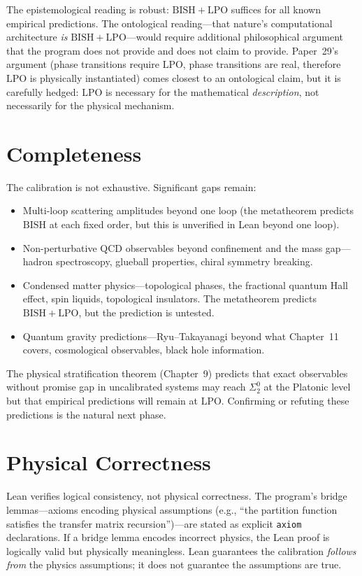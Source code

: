 \documentclass[11pt,a4paper]{report}
\theoremstyle{plain}
\theoremstyle{definition}
\theoremstyle{remark}
\newcommand{\BISH}{\mathrm{BISH}}
\newcommand{\LPO}{\mathrm{LPO}}
\begin{document}
The epistemological reading is robust: $\BISH+\LPO$ suffices for all known empirical predictions. The ontological reading---that nature's computational architecture \emph{is} $\BISH+\LPO$---would require additional philosophical argument that the program does not provide and does not claim to provide. Paper~29's argument (phase transitions require $\LPO$, phase transitions are real, therefore $\LPO$ is physically instantiated) comes closest to an ontological claim, but it is carefully hedged: $\LPO$ is necessary for the mathematical \emph{description}, not necessarily for the physical mechanism.

\section{Completeness}

The calibration is not exhaustive. Significant gaps remain:
\begin{itemize}[nosep]
\item Multi-loop scattering amplitudes beyond one loop (the metatheorem predicts $\BISH$ at each fixed order, but this is unverified in Lean beyond one loop).
\item Non-perturbative QCD observables beyond confinement and the mass gap---hadron spectroscopy, glueball properties, chiral symmetry breaking.
\item Condensed matter physics---topological phases, the fractional quantum Hall effect, spin liquids, topological insulators. The metatheorem predicts $\BISH+\LPO$, but the prediction is untested.
\item Quantum gravity predictions---Ryu--Takayanagi beyond what Chapter~11 covers, cosmological observables, black hole information.
\end{itemize}
The physical stratification theorem (Chapter~9) predicts that exact observables without promise gap in uncalibrated systems may reach $\Sigma^0_2$ at the Platonic level but that empirical predictions will remain at $\LPO$. Confirming or refuting these predictions is the natural next phase.

\section{Physical Correctness}

Lean verifies logical consistency, not physical correctness. The program's bridge lemmas---axioms encoding physical assumptions (e.g., ``the partition function satisfies the transfer matrix recursion'')---are stated as explicit \texttt{axiom} declarations. If a bridge lemma encodes incorrect physics, the Lean proof is logically valid but physically meaningless. Lean guarantees the calibration \emph{follows from} the physics assumptions; it does not guarantee the assumptions are true.
\end{document}
